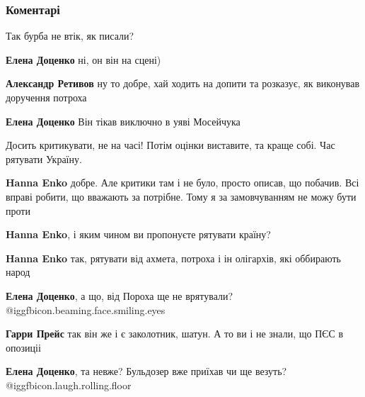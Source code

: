 
 
 
 
 
\subsubsection{Коментарі}
\label{sec:01_12_2021.fb.retivov_aleksandr.kiev.1.miting_skuchno.cmt}

\begin{itemize} %
Так бурба не втік, як писали?

\begin{itemize} %
\textbf{Елена Доценко} ні, он він на сцені)

\textbf{Александр Ретивов} ну то добре, хай ходить на допити та розказує, як виконував доручення потроха

\textbf{Елена Доценко} Він тікав виключно в уяві Мосейчука
\end{itemize} %


Досить критикувати, не на часі! Потім оцінки виставите, та краще собі. Час
рятувати Україну.

\begin{itemize} %
\textbf{Hanna Enko} добре. Але критики там і не було, просто описав, що побачив. Всі вправі робити, що вважають за потрібне. Тому я за замовчуванням не можу бути проти

\textbf{Hanna Enko}, і яким чином ви пропонуєте рятувати країну?

\textbf{Hanna Enko} так, рятувати від ахмета, потроха і ін олігархів, які оббирають народ

\textbf{Елена Доценко}, а що, від Пороха ще не врятували?  @igg{fbicon.beaming.face.smiling.eyes} 

\textbf{Гарри Прейс} так він же і є заколотник, шатун. А то ви і не знали, що ПЄС в опозиціі

\textbf{Елена Доценко}, та невже?
Бульдозер вже приїхав чи ще везуть?  @igg{fbicon.laugh.rolling.floor} 


\end{itemize}
\end{itemize}
